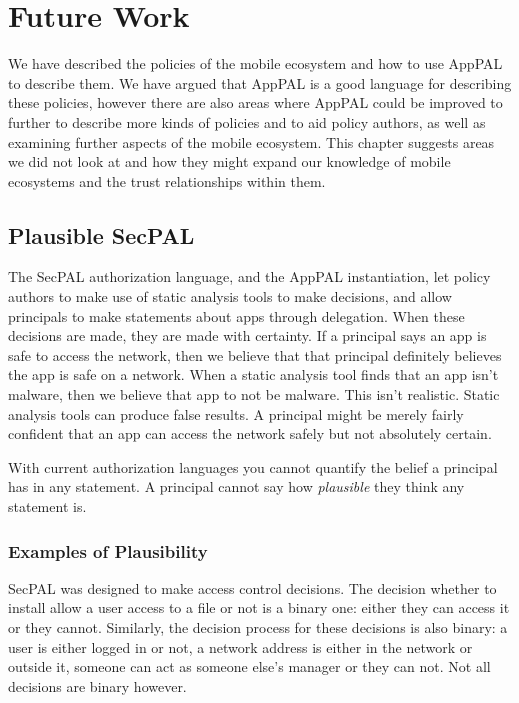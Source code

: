 \documentclass[thesis.tex]{subfiles}
\begin{document}
\chapter{Future Work}
\label{chap:future-work}

We have described the policies of the mobile ecosystem and how to use AppPAL to
describe them. We have argued that AppPAL is a good language for describing
these policies, however there are also areas where AppPAL could be improved to
further to describe more kinds of policies and to aid policy authors, as well as
examining further aspects of the mobile ecosystem. This chapter suggests areas
we did not look at and how they might expand our knowledge of mobile ecosystems
and the trust relationships within them.

\section{Plausible SecPAL}

The SecPAL authorization language, and the AppPAL instantiation, let policy
authors to make use of static analysis tools to make decisions, and allow
principals to make statements about apps through delegation. When these
decisions are made, they are made with certainty. If a principal says an app is
safe to access the network, then we believe that that principal definitely
believes the app is safe on a network. When a static analysis tool finds that an
app isn't malware, then we believe that app to not be malware. This isn't
realistic. Static analysis tools can produce false results. A principal might be
merely fairly confident that an app can access the network safely but not
absolutely certain.

With current authorization languages you cannot quantify the belief a principal
has in any statement. A principal cannot say how \emph{plausible} they think any
statement is.

\subsection{Examples of Plausibility}

SecPAL was designed to make access control decisions. The decision whether to
install allow a user access to a file or not is a binary one: either they can
access it or they cannot. Similarly, the decision process for these decisions is
also binary: a user is either logged in or not, a network address is either in
the network or outside it, someone can act as someone else's manager or they can
not. Not all decisions are binary however.
\end{document}
